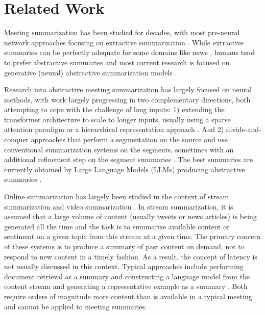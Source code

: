 \section{Related Work}

Meeting summarization has been studied for decades, with most pre-neural network approaches focusing on extractive summarization \citep{waibel1998meeting,zechner2002automatic,tur2008calo,garg2009clusterrank,tixier2017combining}. While extractive summaries can be perfectly adequate for some domains like news \citep{zhong2020extractive}, humans tend to prefer abstractive summaries \citep{murray2010generating,zhang2023benchmarking} and most current research is focused on generative (neural) abstractive summarization models \citep{zhu2020hierarchical,fabbri2021convosumm,zhang2022summn}.

Research into abstractive meeting summarization has largely focused on neural methods, with work largely progressing in two complementary directions, both attempting to cope with the challenge of long inputs: 1) extending the transformer \citep{vaswani2017attention} architecture to scale to longer inputs, usually using a sparse attention paradigm \citep{brown2020language,fabbri2021convosumm,zhong2022dialoglm} or a hierarchical representation approach \citep{zhu2020hierarchical}. And 2) divide-and-conquer approaches that perform a segmentation on the source and use conventional summarization systems on the segments, sometimes with an additional refinement step on the segment summaries \citep{zhang2022summn,asi2022end,liu2022dynamic}. The best summaries are currently obtained by Large Language Models (LLMs) producing abstractive summaries \citep{zhang2023benchmarking}. %

Online summarization has largely been studied in the context of stream summarization and video summarization \citep{sequiera2018overview}. In stream summarization, it is assumed that a large volume of content (usually tweets or news articles) is being generated all the time and the task is to summarize available content or sentiment on a given topic from this stream at a given time.
The primary concern of these systems is to produce a summary of past content on demand, not to respond to new content in a timely fashion. As a result, the concept of latency is not usually discussed in this context.
Typical approaches include performing document retrieval as a summary \citep{ge2016news} and constructing a language model from the content stream and generating a representative example as a summary \citep{olariu2014efficient}. Both require orders of magnitude more content than is available in a typical meeting and cannot be applied to meeting summaries.


